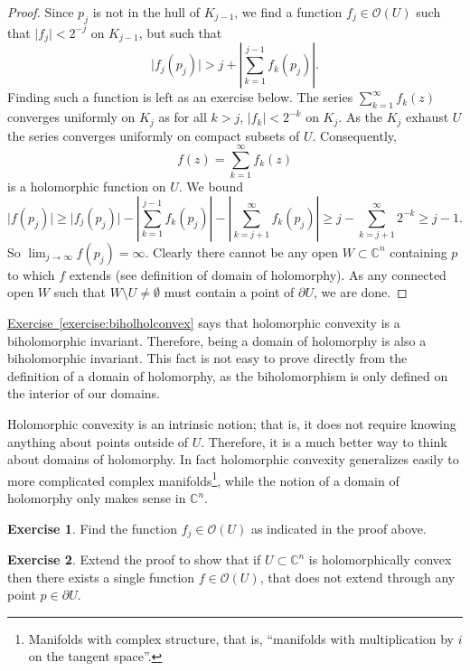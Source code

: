 \documentclass[12pt,openany]{book}
\newcommand{\sabs}[1]{\lvert {#1} \rvert}
\newcommand{\abs}[1]{\left\lvert {#1} \right\rvert}
\newcommand{\C}{{\mathbb{C}}}
\newcommand{\sO}{{\mathscr{O}}}
\theoremstyle{plain}
\theoremstyle{remark}
\theoremstyle{definition}
\newenvironment{exbox}{%
    \def\FrameCommand{\vrule width 1pt \relax\hspace {10pt}}%
    \MakeFramed {\advance \hsize -\width \FrameRestore }%
}{%
    \endMakeFramed
}
\theoremstyle{exercise}
\newtheorem{exercise}{Exercise}[section]
\theoremstyle{example}
\newcommand{\exerciseref}[1]{\hyperref[#1]{Exercise~\ref*{#1}}}
\begin{document}
\begin{proof}
Since $p_j$ is not in the hull of $K_{j-1}$, we find a function $f_j \in
\sO(U)$ such that $\sabs{f_j} < 2^{-j}$ on $K_{j-1}$, but such that
\begin{equation*}
\sabs{f_j(p_j)} > j + \abs{\sum_{k=1}^{j-1} f_k(p_j)} .
\end{equation*}
Finding such a function is left as an exercise below.
The series $\sum_{k=1}^\infty f_k(z)$ converges uniformly on $K_j$
as for all $k > j$, $\sabs{f_k} < 2^{-k}$ on $K_j$.
As the $K_j$ exhaust $U$ the series converges uniformly on compact
subsets of $U$.  Consequently,
\begin{equation*}
f(z) = \sum_{k=1}^\infty f_k(z)
\end{equation*}
is a holomorphic function on $U$.  We bound
\begin{equation*}
\sabs{f(p_j)} \geq
\sabs{f_j(p_j)}
-
\abs{\sum_{k=1}^{j-1} f_k(p_j)}
-
\abs{\sum_{k=j+1}^\infty f_k(p_j)}
\geq
j
-
\sum_{k=j+1}^\infty 2^{-k}
\geq j-1 .
\end{equation*}
So $\lim_{j\to\infty} f(p_j) = \infty$.
Clearly there cannot be any open $W \subset \C^n$
containing $p$ to which $f$ extends (see definition of domain of holomorphy).  As any
connected open $W$ such that $W \setminus U \not= \emptyset$ must contain a
point of $\partial U$, we are done.
\end{proof}

\exerciseref{exercise:biholholconvex}
says that holomorphic convexity is a biholomorphic invariant.
Therefore,
being a domain of holomorphy is also a biholomorphic invariant.  This
fact is not easy to prove directly from the definition of a domain of
holomorphy, as the
biholomorphism is only defined on the interior of our domains.

Holomorphic convexity is an intrinsic notion; that is, it does not require
knowing anything about points outside of $U$.  Therefore, it is a much
better way to think about domains of holomorphy.  In fact holomorphic
convexity generalizes easily to more complicated complex
manifolds\footnote{Manifolds with complex structure, that is, ``manifolds
with multiplication by $i$ on the tangent space''.}, while
the notion of a domain of holomorphy only makes sense in $\C^n$.

\begin{exbox}
\begin{exercise}
Find the function $f_j \in \sO(U)$ as indicated in the proof above.
\end{exercise}

\begin{exercise}
Extend the proof to show that if $U \subset \C^n$
is holomorphically convex then there
exists a single function $f \in \sO(U)$, that does not extend through any
point $p \in \partial U$.
\end{exercise}
\end{exbox}
\end{document}
